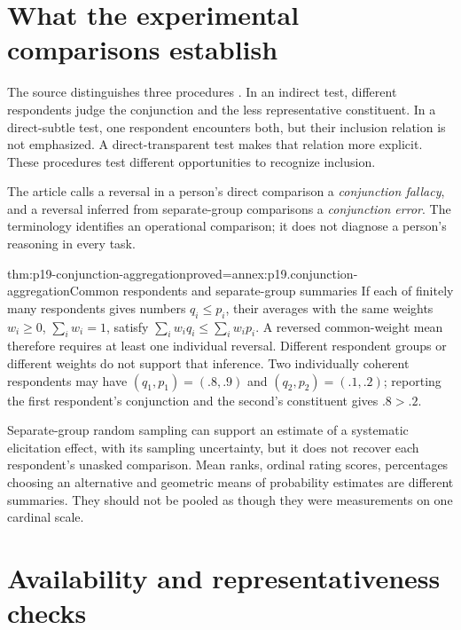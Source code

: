 \section{What the experimental comparisons establish}
\label{sec:p19-conjunction-designs}

The source distinguishes three procedures
\cite[pp.~297--298]{TverskyKahneman1983Conjunction}.
In an indirect test, different respondents judge the conjunction and
the less representative constituent. In a direct-subtle test, one
respondent encounters both, but their inclusion relation is not
emphasized. A direct-transparent test makes that relation more explicit.
These procedures test different opportunities to recognize inclusion.

The article calls a reversal in a person's direct comparison a
\emph{conjunction fallacy}, and a reversal inferred from separate-group
comparisons a \emph{conjunction error}. The terminology identifies an
operational comparison; it does not diagnose a person's reasoning
in every task.

\begin{hblemma}{thm:p19-conjunction-aggregation}{proved=annex:p19.conjunction-aggregation}{Common respondents and separate-group summaries}
If each of finitely many respondents gives numbers \(q_i\leq p_i\),
their averages with the same weights \(w_i\geq0\),
\(\sum_iw_i=1\), satisfy
\(\sum_iw_iq_i\leq\sum_iw_ip_i\).
A reversed common-weight mean therefore requires at least one
individual reversal. Different respondent groups or different weights
do not support that inference. Two individually coherent respondents
may have \((q_1,p_1)=(.8,.9)\) and
\((q_2,p_2)=(.1,.2)\); reporting the first respondent's conjunction
and the second's constituent gives \(.8>.2\).
\end{hblemma}

Separate-group random sampling can support an estimate of a systematic
elicitation effect, with its sampling uncertainty, but it does not
recover each respondent's unasked comparison. Mean ranks, ordinal
rating scores, percentages choosing an alternative and geometric
means of probability estimates are different summaries. They should
not be pooled as though they were measurements on one cardinal scale.

\section{Availability and representativeness checks}
\label{sec:p19-conjunction-availability}

